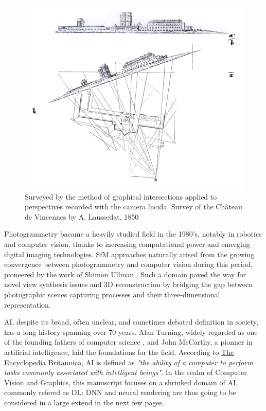 \begin{figure}[htp!]
      \begin{center}
      \includegraphics[width=.5\textwidth]{images/introduction/laussedat_phtograpmetrie.png}
      \end{center}
      \caption{Surveyed by the method of graphical intersections applied to perspectives recorded with the camera lucida. Survey of the Château de Vincennes by A. Laussedat, 1850}
      \label{fig:intro_laussedat}
\end{figure}

Photogrammetry bacame a heavily studied field in the 1980's, notably in robotics and computer vision, thanks to increasing computational power and emerging digital imaging technologies. \ac{SfM} approaches naturally arised from the growing convergence between photogrammetry and computer vision during this period, pioneered by the work of Shimon Ullman \citep{ullman1979interpretation}. Such a domain paved the way for novel view synthesis issues and 3D reconstruction by bridging the gap between photographic scenes capturing processes and their three-dimensional representation. 

\ac{AI}, despite its broad, often unclear, and sometimes debated definition in society, has a long history spanning over 70 years. Alan Turning, widely regarded as one of the founding fathers of computer science \citep{turing1950computing}, and John McCarthy, a pionner in artificial intelligence, laid the foundations for the field. According to \href{https://www.britannica.com/technology/artificial-intelligence}{The Encyclopedia Britannica}, \ac{AI} is defined as \textit{"the ability of a computer to perform tasks commonly associated with intelligent beings"}. In the realm of Computer Vision and Graphics, this manuscript focuses on a shrinked domain of \ac{AI}, commonly refered as \ac{DL}: \ac{DNN} and neural rendering are thus going to be considered in a large extend in the next few pages.

